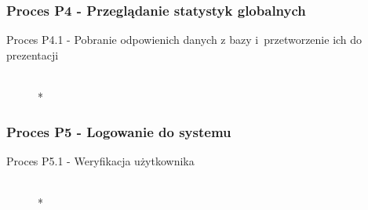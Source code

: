 \subsubsection{Proces P4 - Przeglądanie statystyk globalnych}
\begin{description}
\item[Proces P4.1 - Pobranie odpowienich danych z bazy i~przetworzenie ich do prezentacji] ~\\*
\end{description}
\subsubsection{Proces P5 - Logowanie do systemu}
\begin{description}
\item[Proces P5.1 - Weryfikacja użytkownika] ~\\*
\end{description}
